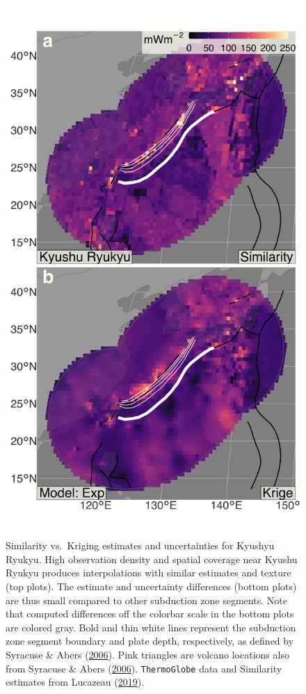 \begin{figure}[htbp]

{\centering \includegraphics[width=0.65\linewidth,]{assets/figs/chpt3/KyushuRyukyuDiffComp} 

}

\caption[Similarity vs. Kriging estimates and uncertainties for Kyushyu Ryukyu]{Similarity vs.~Kriging estimates and uncertainties for Kyushyu Ryukyu. High observation density and spatial coverage near Kyushu Ryukyu produces interpolations with similar estimates and texture (top plots). The estimate and uncertainty differences (bottom plots) are thus small compared to other subduction zone segments. Note that computed differences off the colorbar scale in the bottom plots are colored gray. Bold and thin white lines represent the subduction zone segment boundary and plate depth, respectively, as defined by Syracuse \& Abers (\protect\hyperlink{ref-syracuse2006}{2006}). Pink triangles are volcano locations also from Syracuse \& Abers (\protect\hyperlink{ref-syracuse2006}{2006}). \texttt{ThermoGlobe} data and Similarity estimates from Lucazeau (\protect\hyperlink{ref-lucazeau2019}{2019}).}\label{fig:kyushuRyukyuDiff}
\end{figure}



